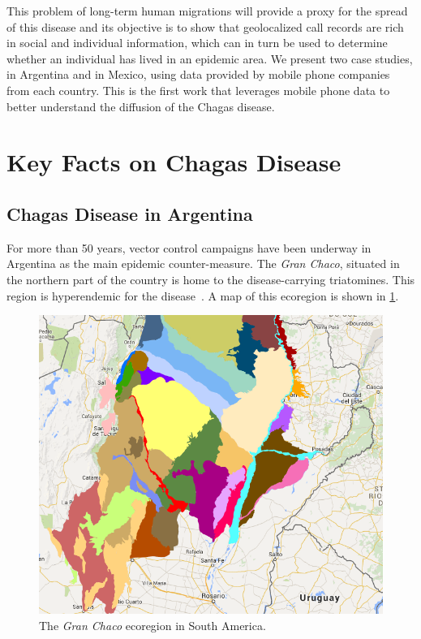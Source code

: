 This problem of long-term human migrations will provide a proxy for the spread of this disease and its objective is to show that geolocalized call records are rich in social and individual information, which can in turn be used to determine whether an individual has lived in an epidemic area. 
We present two case studies, in Argentina and in Mexico, using data provided by mobile phone companies from each country. %
This is the first work that leverages mobile phone data to better understand the diffusion of the Chagas disease.



\section{Key Facts on Chagas Disease}

\subsection{Chagas Disease in  Argentina}\label{endemic_zone_argentina}

For more than 50 years, vector control campaigns have been underway in Argentina as the main epidemic counter-measure. The \textit{Gran Chaco}, situated in the northern part of the country is home to the disease-carrying triatomines. This region is hyperendemic for the disease~\cite{OPS2014mapa}. A map of this ecoregion is shown in \cref{fig:granchaco}.

\begin{figure}[ht]
\centering
\includegraphics[width=0.75\columnwidth]{figures/Ambientes_GranChaco_TNC-Argentina/Ambientes_GranChaco_TNC-Argentina.png}
\caption{The \textit{Gran Chaco} ecoregion in South America.%
}
\label{fig:granchaco}
\end{figure}

